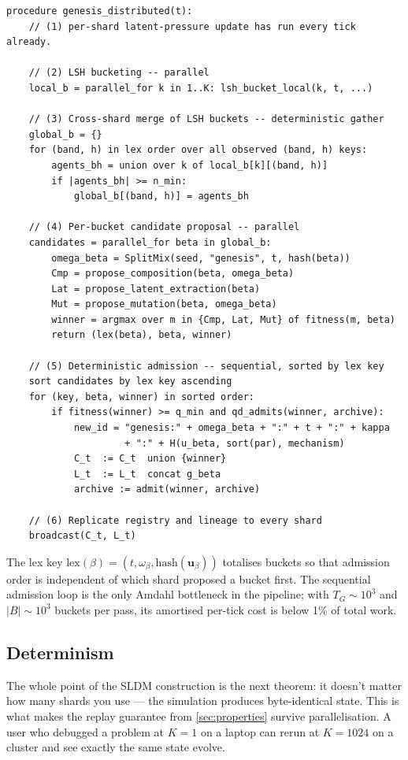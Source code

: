 \documentclass[journal,onecolumn,11pt]{IEEEtran}
\theoremstyle{definition}
\begin{document}
\begin{verbatim}
procedure genesis_distributed(t):
    // (1) per-shard latent-pressure update has run every tick already.

    // (2) LSH bucketing -- parallel
    local_b = parallel_for k in 1..K: lsh_bucket_local(k, t, ...)

    // (3) Cross-shard merge of LSH buckets -- deterministic gather
    global_b = {}
    for (band, h) in lex order over all observed (band, h) keys:
        agents_bh = union over k of local_b[k][(band, h)]
        if |agents_bh| >= n_min:
            global_b[(band, h)] = agents_bh

    // (4) Per-bucket candidate proposal -- parallel
    candidates = parallel_for beta in global_b:
        omega_beta = SplitMix(seed, "genesis", t, hash(beta))
        Cmp = propose_composition(beta, omega_beta)
        Lat = propose_latent_extraction(beta)
        Mut = propose_mutation(beta, omega_beta)
        winner = argmax over m in {Cmp, Lat, Mut} of fitness(m, beta)
        return (lex(beta), beta, winner)

    // (5) Deterministic admission -- sequential, sorted by lex key
    sort candidates by lex key ascending
    for (key, beta, winner) in sorted order:
        if fitness(winner) >= q_min and qd_admits(winner, archive):
            new_id = "genesis:" + omega_beta + ":" + t + ":" + kappa
                     + ":" + H(u_beta, sort(par), mechanism)
            C_t  := C_t  union {winner}
            L_t  := L_t  concat g_beta
            archive := admit(winner, archive)

    // (6) Replicate registry and lineage to every shard
    broadcast(C_t, L_t)
\end{verbatim}

The lex key $\mathrm{lex}(\beta) = (t, \omega_\beta, \mathrm{hash}(\mathbf{u}_\beta))$ totalises buckets so that admission order is independent of which shard proposed a bucket first. The sequential admission loop is the only Amdahl bottleneck in the pipeline; with $T_G \sim 10^3$ and $|B| \sim 10^3$ buckets per pass, its amortised per-tick cost is below 1\% of total work.

\subsection{Determinism}

The whole point of the SLDM construction is the next theorem: it doesn't matter how many shards you use --- the simulation produces byte-identical state. This is what makes the replay guarantee from \cref{sec:properties} survive parallelisation. A user who debugged a problem at $K = 1$ on a laptop can rerun at $K = 1024$ on a cluster and see exactly the same state evolve.
\end{document}
